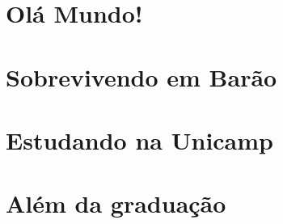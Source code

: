 \documentclass[a4paper,10pt,openany]{book}
\begin{document}
\tableofcontents

\mainmatter
\chapter{Olá Mundo!}


\clearpage


\clearpage


\clearpage

\twocolumn


\chapter{Sobrevivendo em Barão}

\newpage

\newpage

\newpage

\newpage


\chapter{Estudando na Unicamp}

\newpage

\newpage

\newpage

\newpage

\newpage

\newpage

\newpage

\newpage


\chapter{Além da graduação}

\newpage

\newpage

\newpage

\newpage

\newpage

\newpage

\newpage

\end{document}
